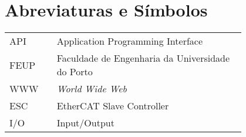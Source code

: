 \chapter*{Abreviaturas e Símbolos}

\begin{flushleft}
\begin{tabular}{l p{0.8\linewidth}}
API      & Application Programming Interface\\
FEUP     & Faculdade de Engenharia da Universidade do Porto\\
WWW      & \emph{World Wide Web}\\
ESC      & EtherCAT Slave Controller\\
I/O      & Input/Output\\
\end{tabular}
\end{flushleft}

